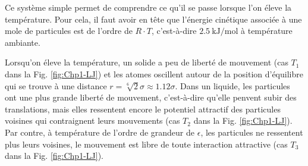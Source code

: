 \documentclass[a4paper]{book}
\begin{document}
Ce système simple permet de comprendre ce qu'il se passe lorsque l'on éleve la température. Pour cela, il faut avoir en tête que l'énergie cinétique associée à une mole de particules est de l'ordre de $R \cdot T$, c'est-à-dire $2.5 ~ \si{\kilo\joule\per\mole}$ à température ambiante.

Lorsqu'on éleve la température, un solide a peu de liberté de mouvement (cas $T_1$ dans la Fig. \ref{fig:Chp1-LJ}) et les atomes oscillent autour de la position d'équilibre qui se trouve à une distance $r = \sqrt[6]{2} \sigma \approx 1.12 \sigma$. Dans un liquide, les particules ont une plus grande liberté de mouvement, c'est-à-dire qu'elle penvent subir des translations, mais elles ressentent encore le potentiel attractif des particules voisines qui contraignent leurs mouvements (cas $T_2$ dans la Fig. \ref{fig:Chp1-LJ}). Par contre, à température de l'ordre de grandeur de $\epsilon$, les particules ne ressentent plus leurs voisines, le mouvement est libre de toute interaction attractive (cas $T_3$ dans la Fig. \ref{fig:Chp1-LJ}).

%
%
%
%
%
\end{document}

